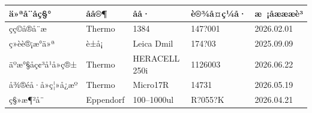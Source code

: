 \documentclass[UTF8,10pt,a4paper,fontset=fandol]{ctexart}
\newcommand{\fieldvalue}[1]{#1}
\newcommand{\handwritten}[1]{#1}
\begin{document}
\begin{center}
\small
\begin{tabular}{|p{3.2cm}|p{2.1cm}|p{3.2cm}|p{3.0cm}|p{3.2cm}|}
\hline
ä»ªå¨åç§° & åå®¶ & åå· & è®¾å¤ç¼å· & æ ¡åæææè³\\
\hline
çç©å®å¨æ &
\fieldvalue{Thermo} &
\fieldvalue{\handwritten{1384}} &
\fieldvalue{\handwritten{147?001}} &
\fieldvalue{\handwritten{2026.02.01}}\\
\hline
ç»èè®¡æ°ä»ª &
\fieldvalue{è±å¡} &
\fieldvalue{Leica Dmil} &
\fieldvalue{\handwritten{174?03}} &
\fieldvalue{\handwritten{2025.09.09}}\\
\hline
äºæ°§åç¢³å¹å»ç®± &
\fieldvalue{Thermo} &
\fieldvalue{HERACELL 250i} &
\fieldvalue{1126003} &
\fieldvalue{2026.06.22}\\
\hline
å¾®éå·å»ç¦»å¿æº &
\fieldvalue{Thermo} &
\fieldvalue{Micro17R} &
\fieldvalue{14731} &
\fieldvalue{2026.05.19}\\
\hline
ç§»æ¶²å¨ &
\fieldvalue{Eppendorf} &
\fieldvalue{\handwritten{100--1000ul}} &
\fieldvalue{\handwritten{R?055?K}} &
\fieldvalue{\handwritten{2026.04.21}}\\
\hline
\end{tabular}
\end{center}
\end{document}
